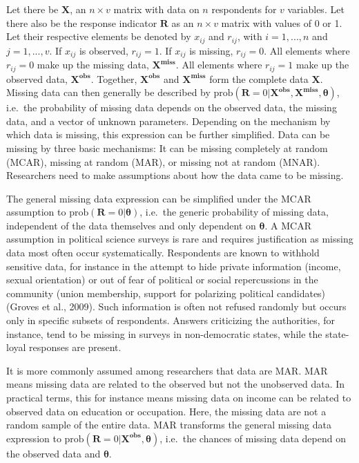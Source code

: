 \documentclass[12pt,econ]{sources/authesis}
\begin{document}
Let there be \(\bm{X}\), an \(n \times v\) matrix with data on \(n\) respondents for \(v\) variables. Let there also be the response indicator \(\bm{R}\) as an \(n \times v\) matrix with values of 0 or 1. Let their respective elements be denoted by \(x_{ij}\) and \(r_{ij}\), with \(i = 1, ..., n\) and \(j = 1, ..., v\). If \(x_{ij}\) is observed, \(r_{ij} = 1\). If \(x_{ij}\) is missing, \(r_{ij} = 0\). All elements where \(r_{ij} = 0\) make up the missing data, \(\bm{X^{miss}}\). All elements where \(r_{ij} = 1\) make up the observed data, \(\bm{X^{obs}}\). Together, \(\bm{X^{obs}}\) and \(\bm{X^{miss}}\) form the complete data \(\bm{X}\). Missing data can then generally be described by \(\text{prob}(\bm{R} = 0 | \bm{X^{obs}}, \bm{X^{miss}}, \bm{\theta})\), i.e.~the probability of missing data depends on the observed data, the missing data, and a vector of unknown parameters. Depending on the mechanism by which data is missing, this expression can be further simplified. Data can be missing by three basic mechanisms: It can be missing completely at random (MCAR), missing at random (MAR), or missing not at random (MNAR). Researchers need to make assumptions about how the data came to be missing.

The general missing data expression can be simplified under the MCAR assumption to \(\text{prob}(\bm{R} = 0 | \bm{\theta})\), i.e.~the generic probability of missing data, independent of the data themselves and only dependent on \(\bm{\theta}\). A MCAR assumption in political science surveys is rare and requires justification as missing data most often occur systematically. Respondents are known to withhold sensitive data, for instance in the attempt to hide private information (income, sexual orientation) or out of fear of political or social repercussions in the community (union membership, support for polarizing political candidates) (Groves et al., 2009). Such information is often not refused randomly but occurs only in specific subsets of respondents. Answers criticizing the authorities, for instance, tend to be missing in surveys in non-democratic states, while the state-loyal responses are present.

It is more commonly assumed among researchers that data are MAR. MAR means missing data are related to the observed but not the unobserved data. In practical terms, this for instance means missing data on income can be related to observed data on education or occupation. Here, the missing data are not a random sample of the entire data. MAR transforms the general missing data expression to \(\text{prob}(\bm{R} = 0 | \bm{X^{obs}}, \bm{\theta})\), i.e.~the chances of missing data depend on the observed data and \(\bm{\theta}\).
\end{document}
